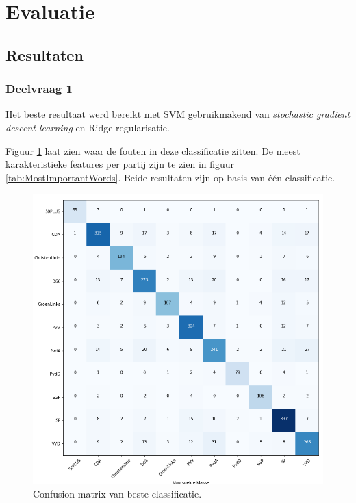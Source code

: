 \section{Evaluatie}
\label{sec:eva}

\subsection{Resultaten}

\subsubsection{Deelvraag 1}
Het beste resultaat werd bereikt met SVM gebruikmakend van \textit{stochastic gradient descent learning} en Ridge regularisatie.\par

Figuur \ref{fig:confusionmatrix} laat zien waar de fouten in deze classificatie zitten. De meest karakteristieke features per partij zijn te zien in figuur \ref{tab:MostImportantWords}. Beide resultaten zijn op basis van één classificatie.


\begin{figure}[H]
  \centering
    \includegraphics[width=0.6\paperwidth]{Verslag/confusionmatrix.png}
\caption{Confusion matrix van beste classificatie.}
\label{fig:confusionmatrix}
\end{figure}

